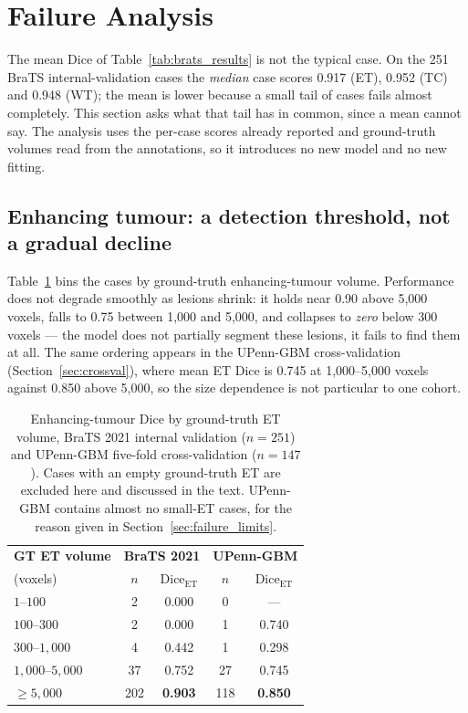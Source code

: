 \documentclass[conference]{IEEEtran}
\begin{document}
\section{Failure Analysis}
\label{sec:failure}

The mean Dice of Table~\ref{tab:brats_results} is not the typical case. On the 251 BraTS internal-validation cases the \emph{median} case scores 0.917 (ET), 0.952 (TC) and 0.948 (WT); the mean is lower because a small tail of cases fails almost completely. This section asks what that tail has in common, since a mean cannot say. The analysis uses the per-case scores already reported and ground-truth volumes read from the annotations, so it introduces no new model and no new fitting.

\subsection{Enhancing tumour: a detection threshold, not a gradual decline}

Table~\ref{tab:failure_size} bins the cases by ground-truth enhancing-tumour volume. Performance does not degrade smoothly as lesions shrink: it holds near 0.90 above 5{,}000 voxels, falls to 0.75 between 1{,}000 and 5{,}000, and collapses to \emph{zero} below 300 voxels --- the model does not partially segment these lesions, it fails to find them at all. The same ordering appears in the UPenn-GBM cross-validation (Section~\ref{sec:crossval}), where mean ET Dice is 0.745 at 1{,}000--5{,}000 voxels against 0.850 above 5{,}000, so the size dependence is not particular to one cohort.

\begin{table}[!t]
\caption{Enhancing-tumour Dice by ground-truth ET volume, BraTS 2021 internal validation ($n=251$) and UPenn-GBM five-fold cross-validation ($n=147$). Cases with an empty ground-truth ET are excluded here and discussed in the text. UPenn-GBM contains almost no small-ET cases, for the reason given in Section~\ref{sec:failure_limits}.}
\label{tab:failure_size}
\centering
\begin{tabular}{lcccc}
\hline
\textbf{GT ET volume} & \multicolumn{2}{c}{\textbf{BraTS 2021}} & \multicolumn{2}{c}{\textbf{UPenn-GBM}} \\
(voxels) & $n$ & Dice$_{\text{ET}}$ & $n$ & Dice$_{\text{ET}}$ \\
\hline
$1$--$100$        & 2   & 0.000 & 0   & --- \\
$100$--$300$      & 2   & 0.000 & 1   & 0.740 \\
$300$--$1{,}000$  & 4   & 0.442 & 1   & 0.298 \\
$1{,}000$--$5{,}000$ & 37  & 0.752 & 27  & 0.745 \\
$\geq 5{,}000$    & 202 & \textbf{0.903} & 118 & \textbf{0.850} \\
\hline
\end{tabular}
\end{table}
\end{document}
